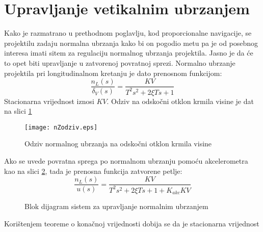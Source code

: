 \section{Upravljanje vetikalnim ubrzanjem}
Kako je razmatrano u prethodnom poglavlju, kod proporcionalne navigacije, se projektilu 
zadaju normalna ubrzanja kako bi on pogodio metu pa je od posebnog interesa imati sitem 
za regulaciju normalnog ubrzanja projektila. Jasno je da će to opet biti upravljanje u 
zatvorenoj povratnoj sprezi. Normalno ubrzanje projektila pri longitudinalnom kretanju 
je dato prenosnom funkcijom:
\begin{equation}
    \frac{n_L(s)}{\delta_V(s)}=\frac{KV}{T^2s^2+2\xi Ts+1}
\end{equation}
Stacionarna vrijednost iznosi $KV$. Odziv na odskočni otklon krmila visine je dat 
na slici \ref{fig:nLodziv}
\begin{figure}[!ht]
    \centering
    \texttt{[image: nZodziv.eps]}
    \caption{Odziv normalnog ubrzanja na odskočni otklon krmila visine}
    \label{fig:nLodziv}
\end{figure}
Ako se uvede povratna sprega po normalnom ubrzanju pomoću akcelerometra kao na slici \ref{fig:akcLoop},
tada je prenosna funkcija zatvorene petlje:
\begin{equation}
    \frac{n_L(s)}{u(s)} = \frac{KV}{T^2s^2+2\xi Ts + 1 +K_{akc}KV}
\end{equation}
\begin{figure}[!ht]
    \centering
    \caption{Blok dijagram sistem za upravljanje normalnim ubrzanjem}
    \label{fig:akcLoop}
\end{figure}
Korištenjem teoreme o konačnoj vrijednosti dobija se da je stacionarna vrijednost 
